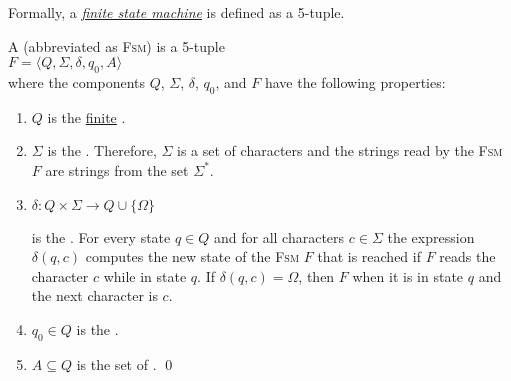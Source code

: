 \noindent
Formally, a \href{http://en.wikipedia.org/wiki/Finite-state_machine}{\emph{finite state machine}} 
is defined as a 5-tuple.
\begin{Definition}
A  (abbreviated as \textsc{Fsm}) is a 5-tuple 
\\[0.2cm]
\hspace*{1.3cm}
$F = \langle Q, \Sigma, \delta, q_0, A\rangle$
\\[0.2cm]
where the components $Q$, $\Sigma$, $\delta$, $q_0$, and $F$ have the following properties:
\begin{enumerate}
\item $Q$ is the \underline{finite} .
\item $\Sigma$ is the  \index{$\Sigma$}.  Therefore, $\Sigma$ is a
      set of characters and 
      the strings read by the \textsc{Fsm} $F$ are strings from the set $\Sigma^*$.
\item $\delta: Q \times \Sigma \rightarrow Q \cup \{ \Omega \}$

      is the  .  For every state $q\in Q$ and for all
      characters $c \in \Sigma$ the expression $\delta(q,c)$ computes the new state of the \textsc{Fsm} $F$
      that is reached if $F$ reads the character $c$ while in state $q$.
      If $\delta(q,c) = \Omega$, then $F$  when it is in state $q$ and the next character
      is $c$. 
\item $q_0 \in Q$ is the . 
\item $A \subseteq Q$ is the set of . 
      \qed
\end{enumerate}
\end{Definition}

